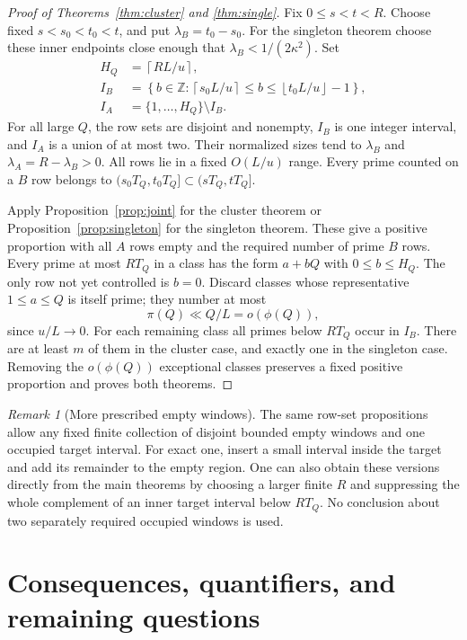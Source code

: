 \documentclass[11pt]{article}
\theoremstyle{remark}
\newtheorem{remark}[theorem]{Remark}
\numberwithin{equation}{section}
\begin{document}
\begin{proof}[Proof of Theorems~\ref{thm:cluster} and \ref{thm:single}]
Fix $0\le s<t<R$. Choose fixed
$s<s_0<t_0<t$, and put $\lambda_B=t_0-s_0$.
For the singleton theorem choose these inner endpoints close
enough that $\lambda_B<1/(2\kappa^2)$.
Set
\begin{align*}
 H_Q&=\left\lceil RL/u\right\rceil,\\
 I_B&=\left\{b\in\mathbb Z:
       \left\lceil s_0L/u\right\rceil
       \le b\le
       \left\lfloor t_0L/u\right\rfloor-1\right\},\\
 I_A&=\{1,\ldots,H_Q\}\setminus I_B .
\end{align*}
For all large $Q$, the row sets are disjoint and nonempty,
$I_B$ is one integer interval, and $I_A$ is a union of at most
two. Their normalized sizes tend to
$\lambda_B$ and $\lambda_A=R-\lambda_B>0$.
All rows lie in a fixed $O(L/u)$ range.
Every prime counted on a $B$ row belongs to
$(s_0T_Q,t_0T_Q]\subset(sT_Q,tT_Q]$.

Apply Proposition~\ref{prop:joint} for the cluster theorem or
Proposition~\ref{prop:singleton} for the singleton theorem.
These give a positive proportion with all $A$ rows empty
and the required number of prime $B$ rows.
Every prime at most $RT_Q$ in a class has the form
$a+bQ$ with $0\le b\le H_Q$.
The only row not yet controlled is $b=0$.
Discard classes whose representative $1\le a\le Q$ is itself
prime; they number at most
\[
 \pi(Q)\ll Q/L=o(\phi(Q)),
\]
since $u/L\to0$.
For each remaining class all primes below $RT_Q$ occur in
$I_B$. There are at least $m$ of them in the cluster case,
and exactly one in the singleton case.
Removing the $o(\phi(Q))$ exceptional classes preserves a
fixed positive proportion and proves both theorems.
\end{proof}

\begin{remark}[More prescribed empty windows]\label{rem:windows}
The same row-set propositions allow any fixed finite collection
of disjoint bounded empty windows and one occupied target interval.
For exact one, insert a small interval inside the target and
add its remainder to the empty region.
One can also obtain these versions directly from the main
theorems by choosing a larger finite $R$ and suppressing the
whole complement of an inner target interval below $RT_Q$.
No conclusion about two separately required occupied windows
is used.
\end{remark}


\section{Consequences, quantifiers, and remaining questions}
\label{sec:consequences}
\end{document}

